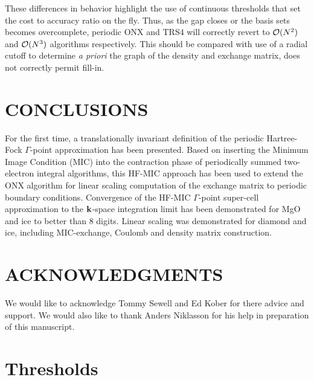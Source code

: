 \documentclass[prb,aps,nobibnotes,twocolumn,doublespace,twocolumngrid,superbib,showpacs]{revtex4}
\begin{document}
These differences in behavior highlight the use of continuous thresholds that set the cost 
to accuracy ratio on the fly.  Thus, as the gap closes or the basis sets becomes overcomplete,  
periodic {\sc ONX} and {\sc TRS4} will correctly revert to ${\cal O}(N^2)$ and ${\cal O}(N^3)$ algorithms 
respectively.  This should be compared with  use of a radial cutoff to determine
{\em a priori } the  graph of the density and exchange matrix, does not correctly  
permit fill-in.

\section{CONCLUSIONS}\label{conclusions}

For the first time, a translationally invariant definition of the periodic 
Hartree-Fock $\Gamma$-point approximation has been presented.  Based on inserting 
the Minimum Image Condition (MIC) into the contraction phase of periodically
summed two-electron integral algorithms,   this HF-MIC approach has been used 
to extend the {\sc ONX} algorithm for linear scaling computation of the exchange 
matrix to periodic boundary conditions.  Convergence of the HF-MIC $\Gamma$-point
super-cell approximation to the ${\bf k}$-space integration limit has been 
demonstrated for MgO and ice to better than 8 digits.  Linear scaling was 
demonstrated for diamond and ice, including MIC-exchange, Coulomb and density matrix 
construction.   

\section*{ACKNOWLEDGMENTS}

We would like to acknowledge Tommy Sewell and Ed Kober for there advice
and support. We would also like to thank Anders Niklasson for his help
in preparation of this manuscript.  

 
 

\appendix

\section{Thresholds}\label{Thresholds}
\end{document}
